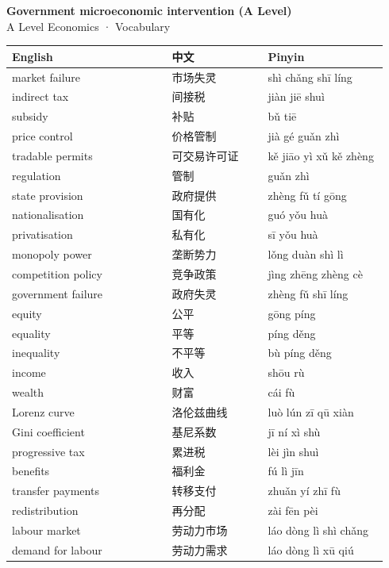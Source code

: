 \documentclass[11pt]{article}
\begin{document}
\begin{center}
  {\LARGE\bfseries Government microeconomic intervention (A Level)}\\[0.35em]
  {\large A Level Economics · Vocabulary}
\end{center}
\vspace{0.6em}

\begin{longtable}{@{}p{0.40\linewidth}p{0.24\linewidth}p{0.30\linewidth}@{}}
\toprule
\textbf{English} & \textbf{中文} & \textbf{Pinyin} \\
\midrule
\endhead
\bottomrule
\endlastfoot
market failure & 市场失灵 & shì chǎng shī líng \\
indirect tax & 间接税 & jiàn jiē shuì \\
subsidy & 补贴 & bǔ tiē \\
price control & 价格管制 & jià gé guǎn zhì \\
tradable permits & 可交易许可证 & kě jiāo yì xǔ kě zhèng \\
regulation & 管制 & guǎn zhì \\
state provision & 政府提供 & zhèng fǔ tí gōng \\
nationalisation & 国有化 & guó yǒu huà \\
privatisation & 私有化 & sī yǒu huà \\
monopoly power & 垄断势力 & lǒng duàn shì lì \\
competition policy & 竞争政策 & jìng zhēng zhèng cè \\
government failure & 政府失灵 & zhèng fǔ shī líng \\
equity & 公平 & gōng píng \\
equality & 平等 & píng děng \\
inequality & 不平等 & bù píng děng \\
income & 收入 & shōu rù \\
wealth & 财富 & cái fù \\
Lorenz curve & 洛伦兹曲线 & luò lún zī qū xiàn \\
Gini coefficient & 基尼系数 & jī ní xì shù \\
progressive tax & 累进税 & lèi jìn shuì \\
benefits & 福利金 & fú lì jīn \\
transfer payments & 转移支付 & zhuǎn yí zhī fù \\
redistribution & 再分配 & zài fēn pèi \\
labour market & 劳动力市场 & láo dòng lì shì chǎng \\
demand for labour & 劳动力需求 & láo dòng lì xū qiú \\

\end{longtable}
\end{document}
